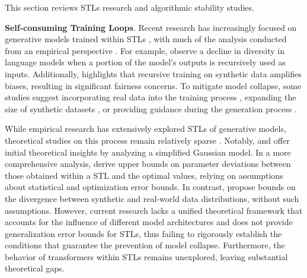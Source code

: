 This section reviews STLs research and algorithmic stability studies.

\textbf{Self-consuming Training Loops}. Recent research has increasingly focused on generative models trained within STLs \citep{shumailov2024ai}, with much of the analysis conducted from an empirical perspective \citep{martinez2023towards}. For example, \citet{shumailov2024ai, briesch2023large} observe a decline in diversity in language models when a portion of the model's outputs is recursively used as inputs. %
Additionally, \citet{wyllie2024fairness} highlights that recursive training on synthetic data amplifies biases, resulting in significant fairness concerns. To mitigate model collapse, some studies suggest incorporating real data into the training process \citep{alemohammadself}, expanding the size of synthetic datasets \citep{dohmatobtale,gerstgrasser2024is,dohmatob2024model,feng2024beyond1}, or providing guidance during the generation process \citep{gillmanself,alemohammad2024self,feng2024beyond2}.





While empirical research has extensively explored STLs of generative models, theoretical studies on this process remain relatively sparse \citep{kanabar2025minimax,seddik2024bad,marchi2024heat,gerstgrasser2024is,zhu2024synthesize,tao2024survey}. Notably, \citet{shumailov2024ai} and \citet{alemohammadself} offer initial theoretical insights by analyzing a simplified Gaussian model. In a more comprehensive analysis, \citet{bertrandstability} derive upper bounds on parameter deviations between those obtained within a STL and the optimal values, relying on assumptions about statistical and optimization error bounds. In contrast, \citet{futowards} propose bounds on the divergence between synthetic and real-world data distributions, without such assumptions. However, current research lacks a unified theoretical framework that accounts for the influence of different model architectures and does not provide generalization error bounds for STLs, thus failing to rigorously establish the conditions that guarantee the prevention of model collapse. Furthermore, the behavior of transformers within STLs remains unexplored, leaving substantial theoretical gaps.



